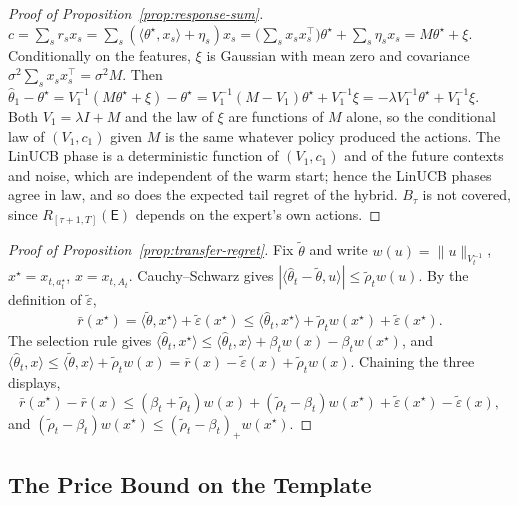 \documentclass{article}
\theoremstyle{definition}
\theoremstyle{remark}
\theoremstyle{remark}
\newcommand{\Exp}{\mathsf{E}}
\newcommand{\wid}{w}
\begin{document}
\begin{proof}[Proof of Proposition~\ref{prop:response-sum}]
$c=\sum_sr_sx_s=\sum_s(\langle\theta^\star,x_s\rangle+\eta_s)x_s
=\bigl(\sum_sx_sx_s^\top\bigr)\theta^\star+\sum_s\eta_sx_s=M\theta^\star+\xi$.
Conditionally on the features, $\xi$ is Gaussian with mean zero and covariance
$\sigma^2\sum_sx_sx_s^\top=\sigma^2M$. Then
$\widehat\theta_1-\theta^\star=V_1^{-1}(M\theta^\star+\xi)-\theta^\star
=V_1^{-1}(M-V_1)\theta^\star+V_1^{-1}\xi=-\lambda V_1^{-1}\theta^\star+V_1^{-1}\xi$.
Both $V_1=\lambda I+M$ and the law of $\xi$ are functions of $M$ alone, so the
conditional law of $(V_1,c_1)$ given $M$ is the same whatever policy produced
the actions. The LinUCB phase is a deterministic function of $(V_1,c_1)$ and of
the future contexts and noise, which are independent of the warm start; hence
the LinUCB phases agree in law, and so does the expected tail regret of the
hybrid. $B_\tau$ is not covered, since $R_{[\tau+1,T]}(\Exp)$ depends on the
expert's own actions.
\end{proof}

\begin{proof}[Proof of Proposition~\ref{prop:transfer-regret}]
Fix $\widetilde\theta$ and write $\wid(u)=\|u\|_{V_t^{-1}}$,
$x^\star=x_{t,a^\star_t}$, $x=x_{t,A_t}$. Cauchy--Schwarz gives
$|\langle\widehat\theta_t-\widetilde\theta,u\rangle|\le\widetilde\rho_t\wid(u)$.
By the definition of $\widetilde\varepsilon$,
\[
\bar r(x^\star)=\langle\widetilde\theta,x^\star\rangle+\widetilde\varepsilon(x^\star)
\le\langle\widehat\theta_t,x^\star\rangle+\widetilde\rho_t\wid(x^\star)+\widetilde\varepsilon(x^\star).
\]
The selection rule gives
$\langle\widehat\theta_t,x^\star\rangle\le\langle\widehat\theta_t,x\rangle+\beta_t\wid(x)-\beta_t\wid(x^\star)$,
and
$\langle\widehat\theta_t,x\rangle\le\langle\widetilde\theta,x\rangle+\widetilde\rho_t\wid(x)
=\bar r(x)-\widetilde\varepsilon(x)+\widetilde\rho_t\wid(x)$.
Chaining the three displays,
\[
\bar r(x^\star)-\bar r(x)\le(\beta_t+\widetilde\rho_t)\wid(x)
+(\widetilde\rho_t-\beta_t)\wid(x^\star)
+\widetilde\varepsilon(x^\star)-\widetilde\varepsilon(x),
\]
and $(\widetilde\rho_t-\beta_t)\wid(x^\star)\le(\widetilde\rho_t-\beta_t)_+\wid(x^\star)$.
\end{proof}

\subsection{The Price Bound on the Template}
\label{app:price-template}
\end{document}
